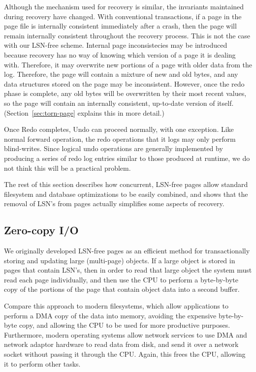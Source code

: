 \documentclass[letterpaper,twocolumn,10pt]{article}
\begin{document}
Although the mechanism used for recovery is similar, the invariants
maintained during recovery have changed.  With conventional
transactions, if a page in the page file is internally consistent
immediately after a crash, then the page will remain internally
consistent throughout the recovery process.  This is not the case with
our LSN-free scheme.  Internal page inconsistecies may be introduced
because recovery has no way of knowing which version of a page it is
dealing with.  Therefore, it may overwrite new portions of a page with
older data from the log.
Therefore, the page will contain a mixture of new and old bytes, and
any data structures stored on the page may be inconsistent.  However,
once the redo phase is complete, any old bytes will be overwritten by
their most recent values, so the page will contain an internally
consistent, up-to-date version of itself.
(Section~\ref{sec:torn-page} explains this in more detail.)

Once Redo completes, Undo can proceed normally, with one exception.
Like normal forward operation, the redo operations that it logs may
only perform blind-writes.  Since logical undo operations are
generally implemented by producing a series of redo log entries
similar to those produced at runtime, we do not think this will be a
practical problem.

The rest of this section describes how concurrent, LSN-free pages 
allow standard filesystem and database optimizations to be easily
combined, and shows that the removal of LSN's from pages actually
simplifies some aspects of recovery.

\subsection{Zero-copy I/O} 

We originally developed LSN-free pages as an efficient method for
transactionally storing and updating large (multi-page) objects.  If a
large object is stored in pages that contain LSN's, then in order to
read that large object the system must read each page individually,
and then use the CPU to perform a byte-by-byte copy of the portions of
the page that contain object data into a second buffer.

Compare this approach to modern filesystems, which allow applications to
perform a DMA copy of the data into memory, avoiding the expensive
byte-by-byte copy, and allowing the CPU to be used for
more productive purposes.  Furthermore, modern operating systems allow
network services to use DMA and network adaptor hardware to read data
from disk, and send it over a network socket without passing it
through the CPU.  Again, this frees the CPU, allowing it to perform
other tasks.
\end{document}
